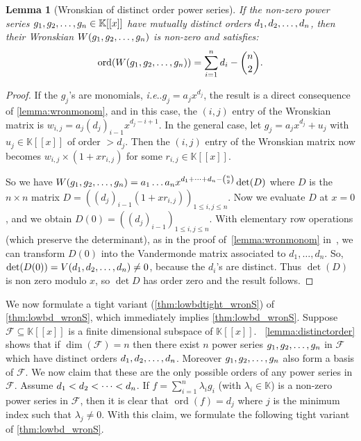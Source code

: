 \documentclass[a4paper, 11pt,dvipsnames]{article}
\makeatletter
\newtheorem{lemma}[theorem]{Lemma}
\DeclareRobustCommand\onedot{\futurelet\@let@token\@onedot}
\def\@onedot{\ifx\@let@token.\else.\null\fi\xspace}
\def\ie{\emph{i.e}\onedot} \def\Ie{\emph{I.e}\onedot}
\newcommand{\ord}{\operatorname{ord}}
\newcommand{\BK}{\mathbb{K}}
\makeatother
\begin{document}
  \begin{lemma} [Wronskian of distinct order power series] If the non-zero power series $\lst g n \in \BK[[x]]$ have mutually distinct orders $d_{1},d_{2},\dots,d_{n}$, then
    their Wronskian $W(g_{1},g_{2},\dots,g_{n})$ is non-zero and satisfies: \begin{align*} \ord (W(\lst g n)) = \sum_{i=1}^n d_i - \binom{n}{2}.  \end{align*}
  \label{lemma:ord_wr_dist_order} \end{lemma}
\begin{proof} If the $g_j$'s are monomials, \ie $g_j = a_j x^{d_j} $, the result is a direct consequence of \cref{lemma:wronmonom}, and in this case, the $(i,j)$ entry of the Wronskian matrix is $w_{i,j} = a_j (d_j)_{i-1}x^{d_j-i+1} $.  In the general case, let $g_j = a_j x^{d_j} + u_j$
    with $u_j \in \BK[[x]]$ of order $> d_j$. Then the $(i,j)$ entry of the Wronskian matrix now becomes $w_{i,j} \times (1 + x r_{i,j})$ for some $r_{i,j} \in \BK[[x]]$.

    So we have $W(g_{1},g_{2},\dots,g_{n})= a_1 \dots a_n x^{d_1 + \dots + d_n - \binom{n}{2}}\det(D) $ where $D$ is the $n \times n$ matrix $D= ((d_j)_{i-1}(1 + x r_{i,j}))_{1 \le i,j \le n}$.
Now we evaluate $D$ at $x=0$, and we obtain $D(0) = ((d_j)_{i-1})_{1 \le i,j \le n}$. With elementary row operations (which preserve the determinant), as in the proof of~\cref{lemma:wronmonom} in~\cite{bostan2010wronskians}, we can transform $D(0)$ into the Vandermonde matrix associated to $d_1, \dots, d_n$. So, $\det(D(0)) = V(d_{1},d_{2},\dots,d_{n}) \neq 0$, because the $d_i$'s are distinct. Thus $\det(D)$ is non zero modulo $x$, so $\det D$ has order zero and the result follows. 
   \end{proof}   
We now formulate a tight variant (\cref{thm:lowbdtight_wronS}) of \cref{thm:lowbd_wronS}, which immediately implies \cref{thm:lowbd_wronS}. Suppose $ \mathcal{F} \subseteq \BK[[x]]$ is a finite dimensional subspace of $\BK[[x]]$. ~\cref{lemma:distinctorder} shows that if $\dim(\mathcal{F})=n$ then there exist $n$ power series $g_{1},g_{2},\dots,g_{n}$ in $\mathcal{F}$ which have distinct orders $d_{1},d_{2},\dots,d_{n}$. Moreover $g_{1},g_{2},\dots,g_{n}$ also form a basis of $ \mathcal{F}$. We now claim that these are the only possible orders of any power series in $\mathcal{F}$. Assume $d_{1}<d_{2}<\dots<d_{n}$. If $f=\sum_{i=1}^{n}\lambda_i g_i$ (with $\lambda_i \in \BK$) is a non-zero power series in $\mathcal{F}$, then it is clear that $\ord(f)=d_j$ where $j$ is the minimum index such that $\lambda_j \neq 0$. With this claim, we formulate the following tight variant of \cref{thm:lowbd_wronS}.
\end{document}
